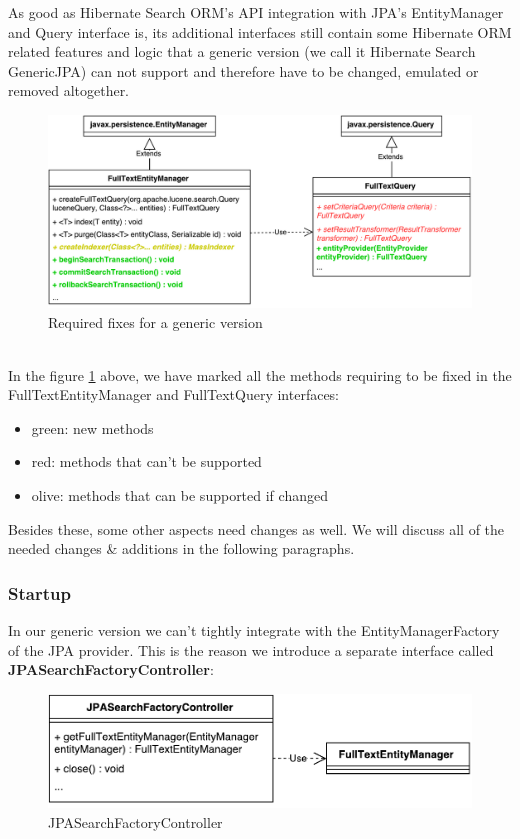 As good as Hibernate Search ORM's API integration with JPA's EntityManager and Query interface is, its additional interfaces still contain some Hibernate ORM related features and logic that a generic version (we call it Hibernate Search GenericJPA) can not support and therefore have to be changed, emulated or removed altogether.
\\
\begin{figure}[ht]
	\centering
	\includegraphics[scale=0.6]{images/hibernate_search_jpa_integration_with_differences.pdf}
	\caption{Required fixes for a generic version}
	\label{hibernate_search_jpa_integration_with_differences}
\end{figure}
\\
In the figure \ref{hibernate_search_jpa_integration_with_differences} above, we have marked all the methods requiring to be fixed in the FullTextEntityManager and FullTextQuery interfaces:
\begin{itemize}
	\item green: new methods
	\item red: methods that can't be supported
	\item olive: methods that can be supported if changed
\end{itemize}
\noindent
Besides these, some other aspects need changes as well. We will discuss all of the needed changes \& additions in the following paragraphs.

\pagebreak

\subsubsection{Startup}

In our generic version we can't tightly integrate with the EntityManagerFactory of the JPA provider. This is the reason we introduce a separate interface called \textbf{JPASearchFactoryController}:
\\
\begin{figure}[ht]
	\centering
	\includegraphics[scale=0.6]{images/JPASearchFactoryController.pdf}
	\caption{JPASearchFactoryController}
	\label{jpa_searchfactory_controller}
\end{figure}

